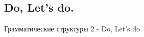 \subsection{Do, Let's do.}
Грамматические структуры 2 - Do, Let's do
\subsection*{}
\begin{verbatim}

\end{verbatim}

\subsection*{}
\begin{verbatim}

\end{verbatim}

\subsection*{}
\begin{verbatim}

\end{verbatim}

\subsection*{}
\begin{verbatim}

\end{verbatim}